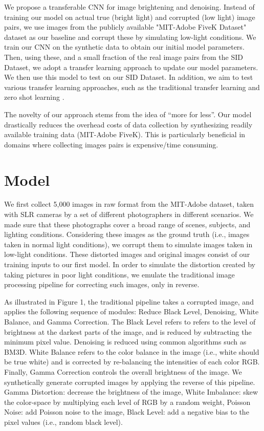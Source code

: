 \documentclass{article}
\begin{document}
We propose a transferable CNN for image brightening and denoising. Instead
of training our model on actual true (bright light) and corrupted
(low light) image pairs, we use images from the publicly available "MIT-Adobe FiveK Dataset" dataset as our baseline and corrupt these by simulating low-light conditions. We train our CNN on the synthetic data to obtain our initial model
parameters. Then, using these, and a small fraction of the real image pairs
from the SID Dataset, we adopt a transfer learning
\cite{Goodfellow-et-al-2016} approach to update our
model parameters. We then use this model to test on our SID Dataset. In
addition, we aim to test various transfer learning approaches, such as the
traditional transfer learning and zero shot learning \cite{larochelle2008,
  Palatucci:2009:ZLS:2984093.2984252, socher2013zeroshot}.\newline


The novelty of our approach stems from the idea of ``more for less''. Our
model drastically reduces the overhead costs of data collection by
synthesizing readily available training data (MIT-Adobe FiveK). This is
particularly beneficial in domains where collecting images pairs is
expensive/time consuming. 


\section{Model}

We first collect 5,000 images in raw format from the MIT-Adobe dataset, taken with SLR cameras by a set of different photographers in different scenarios. We made sure that these photographs cover a broad range of scenes, subjects, and lighting conditions. Considering these images as the ground truth (i.e., images taken in normal light conditions), we corrupt them to simulate images taken in low-light conditions. These distorted images and original images consist of our training inputs to our first model. 
In order to simulate the distortion created by taking pictures in poor light conditions, we emulate the traditional image processing pipeline for correcting such images, only in reverse. 

As illustrated in Figure 1, the traditional pipeline takes a corrupted image, and applies the following sequence of modules: Reduce Black Level, Denoising, White Balance, and Gamma Correction. The Black Level refers to refers to the level of brightness at the darkest parts of the image, and is reduced by subtracting the minimum pixel value. Denoising is reduced using common algorithms such as BM3D. White Balance refers to the color balance in the image (i.e., white should be true white) and is corrected by re-balancing the intensities of each color RGB. Finally, Gamma Correction controls the overall brightness of the image. We synthetically generate corrupted images by applying the reverse of this pipeline. Gamma Distortion: decrease the brightness of the image, White Imbalance: skew the color-space by multiplying each level of RGB by a random weight, Poisson Noise: add Poisson noise to the image, Black Level: add a negative bias to the pixel values (i.e., random black level). 
\end{document}
